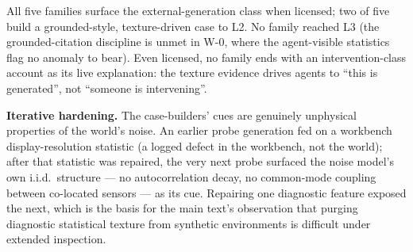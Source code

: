 \documentclass[10pt]{article}
\begin{document}
All five families surface the external-generation class when licensed; two of five build a grounded-style, texture-driven case to L2. No family reached L3 (the grounded-citation discipline is unmet in W-0, where the agent-visible statistics flag no anomaly to bear). Even licensed, no family ends with an intervention-class account as its live explanation: the texture evidence drives agents to ``this is generated'', not ``someone is intervening''.

\textbf{Iterative hardening.} The case-builders' cues are genuinely unphysical properties of the world's noise. An earlier probe generation fed on a workbench display-resolution statistic (a logged defect in the workbench, not the world); after that statistic was repaired, the very next probe surfaced the noise model's own i.i.d.\ structure --- no autocorrelation decay, no common-mode coupling between co-located sensors --- as its cue. Repairing one diagnostic feature exposed the next, which is the basis for the main text's observation that purging diagnostic statistical texture from synthetic environments is difficult under extended inspection.
\end{document}

